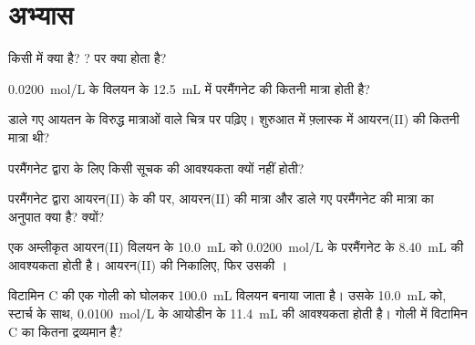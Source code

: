 \section{अभ्यास}


\begin{exercise}[$\star$]\label{exo:g11:titration:1}
किसी  में  क्या है? ?  पर
क्या होता है?
\end{exercise}

\begin{exercise}[$\star$]\label{exo:g11:titration:2}
\qty{0.0200}{mol/L} के विलयन के \qty{12.5}{mL} में परमैंगनेट  की
कितनी मात्रा होती है?
\end{exercise}

\begin{exercise}[$\star$]\label{exo:g11:titration:3}
डाले गए आयतन के विरुद्ध मात्राओं वाले चित्र पर
 पढ़िए। शुरुआत में फ़्लास्क में आयरन(II) की कितनी मात्रा
थी?
\end{exercise}

\begin{exercise}[$\star$]\label{exo:g11:titration:4}
परमैंगनेट द्वारा  के लिए किसी सूचक की आवश्यकता क्यों नहीं होती?
\end{exercise}

\begin{exercise}[$\star$]\label{exo:g11:titration:5}
परमैंगनेट द्वारा आयरन(II) के  की  पर, आयरन(II) की मात्रा और
डाले गए परमैंगनेट की मात्रा का अनुपात क्या है?
क्यों?
\end{exercise}

\begin{exercise}[$\star\star$]\label{exo:g11:titration:6}
एक अम्लीकृत आयरन(II) विलयन के \qty{10.0}{mL} को \qty{0.0200}{mol/L} के
परमैंगनेट के \qty{8.40}{mL} की आवश्यकता होती है। आयरन(II) की 
निकालिए, फिर उसकी ।
\end{exercise}

\begin{exercise}[$\star\star$]\label{exo:g11:titration:7}
विटामिन C की एक गोली को घोलकर \qty{100.0}{mL} विलयन बनाया जाता है।
उसके \qty{10.0}{mL} को, स्टार्च के साथ, \qty{0.0100}{mol/L} के आयोडीन के
\qty{11.4}{mL} की आवश्यकता होती है। गोली में विटामिन C का कितना द्रव्यमान है?
\end{exercise}

